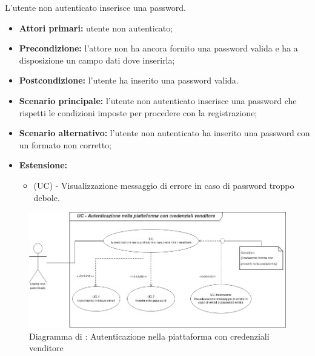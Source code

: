 L'utente non autenticato inserisce una password.
\begin{itemize}
	\item \textbf{Attori primari:} utente non autenticato;
	\item \textbf{Precondizione:} l'attore non ha ancora fornito una password valida e ha a disposizione un campo dati dove inserirla;
	\item \textbf{Postcondizione:} l'utente ha inserito una password valida.
	\item \textbf{Scenario principale:} l'utente non autenticato inserisce una password che rispetti le condizioni imposte per procedere con la registrazione;
	\item \textbf{Scenario alternativo:} l'utente non autenticato ha inserito una password con un formato non corretto;
	\item \textbf{Estensione:}
	\begin{itemize}
		\item (UC) - Visualizzazione messaggio di errore in caso di password troppo debole.
	\end{itemize}
\end{itemize}

\begin{figure}[H]
    \centering
    \includegraphics[scale=0.6]{Immagini/DiagrammiUC/AccessoVenditore.png}
    \caption{Diagramma di \actualUC: Autenticazione nella piattaforma con credenziali venditore} 
    \label{fig:LoginVenditore}
\end{figure}

